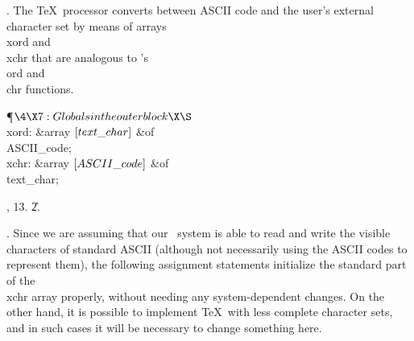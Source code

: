 . The \TeX\ processor converts between ASCII code and
the user's external character set by means of arrays \\{xord} and \\{xchr}
that are analogous to \PASCAL's \\{ord} and \\{chr} functions.

\Y\P$\4\X7:Globals in the outer block\X\S$\6
\4\\{xord}: \&{array} $[\\{text\_char}]$ \1\&{of}\5
\\{ASCII\_code};\2\6
\4\\{xchr}: \&{array} $[\\{ASCII\_code}]$ \1\&{of}\5
\\{text\_char};\2\par
{}, 13.
\U2.\fi

. Since we are assuming that our \PASCAL\ system is able to read and
write the visible characters of standard ASCII (although not
necessarily using the ASCII codes to represent them), the following
assignment statements initialize the standard part of the \\{xchr} array
properly, without needing any system-dependent changes. On the other
hand, it is possible to implement \TeX\ with less complete character
sets, and in such cases it will be necessary to change something here.

